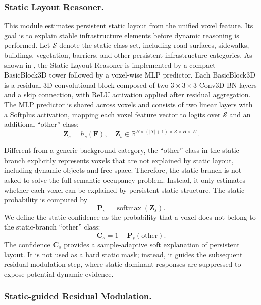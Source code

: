 \subsubsection{Static Layout Reasoner.}
\label{sec:prosd_static_reasoner}
This module estimates persistent static layout from the unified voxel feature.
Its goal is to explain stable infrastructure elements before dynamic reasoning
is performed. Let $\mathcal{S}$ denote the static class set, including road
surfaces, sidewalks, buildings, vegetation, barriers, and other persistent
infrastructure categories. As shown in , the
Static Layout Reasoner is implemented by a compact BasicBlock3D tower followed
by a voxel-wise MLP predictor. Each BasicBlock3D is a residual 3D convolutional
block composed of two $3\times3\times3$ Conv3D-BN layers and a skip connection,
with ReLU activation applied after residual aggregation. The MLP predictor is
shared across voxels and consists of two linear layers with a Softplus
activation, mapping each voxel feature vector to logits over $\mathcal{S}$ and
an additional ``other'' class:
\begin{equation}
  \bm{Z}_{s}=h_s(\bm{F}),
  \quad
  \bm{Z}_{s}\in
  \mathbb{R}^{B\times(|\mathcal{S}|+1)\times Z\times H\times W} .
\end{equation}

Different from a generic background category, the ``other'' class in the static
branch explicitly represents voxels that are not explained by static layout,
including dynamic objects and free space. Therefore, the static branch is not
asked to solve the full semantic occupancy problem. Instead, it only estimates
whether each voxel can be explained by persistent static structure. The static
probability is computed by
\begin{equation}
  \bm{P}_{s}=\operatorname{softmax}(\bm{Z}_{s}).
\end{equation}
We define the static confidence as the probability that a voxel does not belong
to the static-branch ``other'' class:
\begin{equation}
  \bm{C}_{s}
  =
  1-\bm{P}_{s}(\mathrm{other}).
\end{equation}
The confidence $\bm{C}_{s}$ provides a sample-adaptive soft explanation of
persistent layout. It is not used as a hard static mask; instead, it guides the
subsequent residual modulation step, where static-dominant responses are
suppressed to expose potential dynamic evidence.


\subsubsection{Static-guided Residual Modulation.}
\label{sec:prosd_residual_modulation}

